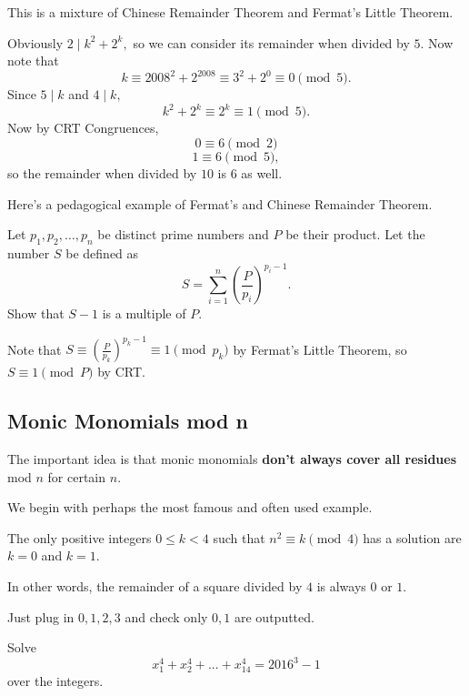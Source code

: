 \documentclass[mast]{lucky}
\begin{document}
\begin{sol}
This is a mixture of Chinese Remainder Theorem and Fermat's Little Theorem.

Obviously $2\mid k^2+2^k,$ so we can consider its remainder when divided by $5.$ Now note that
\[k\equiv {2008}^{2}+{2}^{2008}\equiv 3^2+2^0\equiv 0\pmod{5}.\]
Since $5\mid k$ and $4\mid k,$
\[k^2+2^k\equiv 2^k\equiv 1\pmod{5}.\]
Now by CRT Congruences,
\[0\equiv 6\pmod{2}\]
\[1\equiv 6\pmod{5},\]
so the remainder when divided by $10$ is $6$ as well.
\end{sol}

Here's a pedagogical example of Fermat's and Chinese Remainder Theorem.

\begin{exam}
Let $p_1,p_2,\ldots,p_n$ be distinct prime numbers and $P$ be their product. Let the number $S$ be defined as
\[S=\sum\limits_{i=1}^{n}\left(\frac{P}{p_i}\right)^{p_i-1}.\]
Show that $S-1$ is a multiple of $P.$
\end{exam}

\begin{sol}
Note that $S\equiv \left(\frac{P}{p_k}\right)^{p_k-1}\equiv 1\pmod{p_k}$ by Fermat's Little Theorem, so $S\equiv 1\pmod{P}$ by CRT.
\end{sol}

\subsection{Monic Monomials mod n}
The important idea is that monic monomials \textbf{don't always cover all residues} mod $n$ for certain $n.$

We begin with perhaps the most famous and often used example.

\begin{exam}
The only positive integers $0\leq k<4$ such that $n^2\equiv k\pmod{4}$ has a solution are $k=0$ and $k=1.$
\end{exam}

In other words, the remainder of a square divided by $4$ is always $0$ or $1.$

\begin{sol}
Just plug in $0,1,2,3$ and check only $0,1$ are outputted.
\end{sol}

\begin{exam}
Solve
\[x_{1}^4 + x_{2}^4 +...+ x_{14}^4=2016^3 - 1\]
over the integers.
\end{exam}
\end{document}
